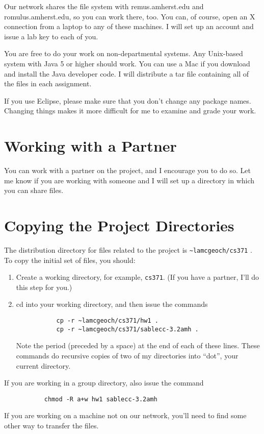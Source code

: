 \documentclass[11pt]{article}
\begin{document}
Our network shares the file system with remus.amherst.edu and romulus.amherst.edu, so you can work there, too. You can, of course, open an X connection from a laptop to any of these machines. I will set up an account and issue a lab key to each of you.

You are free to do your work on non-departmental systems.  Any Unix-based system with Java 5 or higher should work.  You can use a Mac if you download and install the Java developer code. I will distribute a tar file containing all of the files in each assignment.

If you use Eclipse, please make sure that you don't change any package names. Changing things makes it more difficult for me to examine and grade your work.

\section{Working with a Partner}
You can work with a partner on the project, and I encourage you to do so.  Let me know if you are working with someone and I will set up a directory in which you can share files.

\section{Copying the Project Directories}
The distribution directory for files related to the project is \verb'~lamcgeoch/cs371' . To copy the initial set of files, you should:
\begin{enumerate}
\item Create a working directory, for example, \verb'cs371'.  (If you have a partner, I'll do this step for you.)
\item cd into your working directory, and then issue the commands
\begin{verbatim}
           cp -r ~lamcgeoch/cs371/hw1 .
           cp -r ~lamcgeoch/cs371/sablecc-3.2amh .
\end{verbatim}
Note the period (preceded by a space) at the end of each of these lines.  These commands do recursive copies of two of my directories into ``dot'', your current directory.
\end{enumerate}
If you are working in a group directory, also issue the command
\begin{verbatim}
           chmod -R a+w hw1 sablecc-3.2amh
\end{verbatim}

If you are working on a machine not on our network, you'll need to find some other way to transfer the files.
\end{document}

